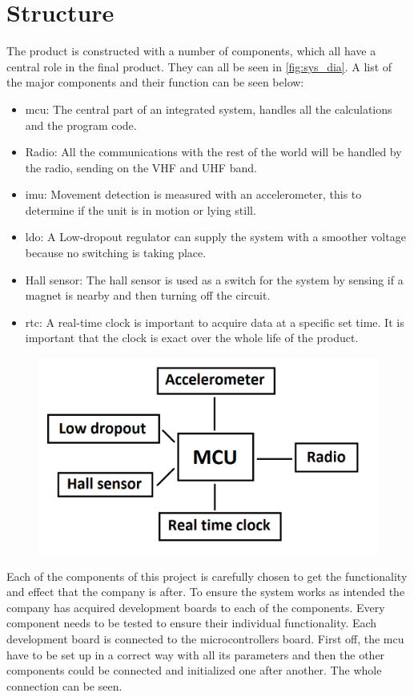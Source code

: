\section{Structure}
The product is constructed with a number of components, which all have a central role in the final product. They can all be seen in \autoref{fig:sys_dia}. A list of the major components and their function can be seen below:

\begin{itemize}[noitemsep] 
\item \gls{mcu}: The central part of an integrated system, handles all the calculations and the program code.
\item Radio: All the communications with the rest of the world will be handled by the radio, sending on the VHF and UHF band.
\item \gls{imu}: Movement detection is measured with an accelerometer, this to determine if the unit is in motion or lying still. 
\item \gls{ldo}: A Low-dropout regulator can supply the system with a smoother voltage because no switching is taking place.
\item Hall sensor: The hall sensor is used as a switch for the system by sensing if a magnet is nearby and then turning off the circuit.
\item \gls{rtc}: A real-time clock is important to acquire data at a specific set time. It is important that the clock is exact over the whole life of the product.
\end{itemize} 


\begin{figure}[H] 
	\centering 
	\includegraphics[width=.8\linewidth]{Figures/System_diagram} 
	\label{fig:sys_dia} 
\end{figure} 

Each of the components of this project is carefully chosen to get the functionality and effect that the company is after. To ensure the system works as intended the company has acquired development boards to each of the components. Every component needs to be tested to ensure their individual functionality. Each development board is connected to the microcontrollers board. First off, the \gls{mcu} have to be set up in a correct way with all its parameters and then the other components could be connected and initialized one after another. The whole connection can be seen. %

